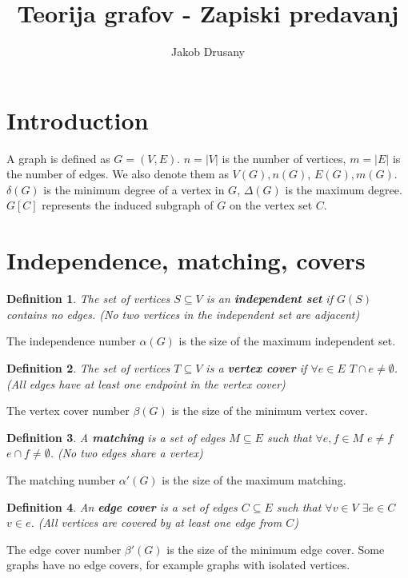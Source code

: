 \documentclass[notitlepage, 12pt]{article}
\title{Teorija grafov - Zapiski predavanj}
\author{Jakob Drusany}
\newtheorem*{definition}{Definition}
\begin{document}
\maketitle
\vspace{1cm}
\tableofcontents
\thispagestyle{empty}
\newpage
{} 
\section{Introduction}
A graph is defined as $G = (V, E)$. $n = |V|$ is the number of vertices, $m = |E|$ is the number of edges.
We also denote them as $V(G), n(G)$, $E(G), m(G)$. $\delta(G)$ is the minimum degree of a vertex in $G$, $\Delta(G)$ is the maximum degree.
$G[C]$ represents the induced subgraph of $G$ on the vertex set $C$.
\section{Independence, matching, covers}
\begin{definition}
  The set of vertices $S \subseteq V$ is an \textbf{independent set} if $G(S)$ contains no edges.
  (No two vertices in the independent set are adjacent)
\end{definition}
The independence number $\alpha(G)$ is the size of the maximum independent set.
\begin{definition}
The set of vertices $T \subseteq V$ is a \textbf{vertex cover} if $\forall e \in E$ $T \cap e \neq \emptyset$.
(All edges have at least one endpoint in the vertex cover)
\end{definition}
The vertex cover number $\beta(G)$ is the size of the minimum vertex cover.
\begin{definition}
  A \textbf{matching} is a set of edges $M \subseteq E$ such that $\forall e, f \in M$ $e\neq f$ $e\cap f\neq \emptyset$.
  (No two edges share a vertex)
\end{definition}
The matching number $\alpha'(G)$ is the size of the maximum matching.
\begin{definition}
  An \textbf{edge cover} is a set of edges $C \subseteq E$ such that $\forall v \in V$ $\exists e \in C$ $v \in e$.
  (All vertices are covered by at least one edge from $C$)
\end{definition}
The edge cover number $\beta'(G)$ is the size of the minimum edge cover.
Some graphs have no edge covers, for example graphs with isolated vertices.
\end{document}
